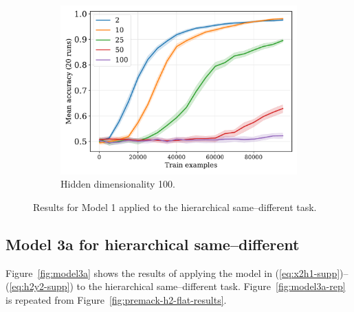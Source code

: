 \documentclass{article}
\newcommand{\Figref}[1]{Figure~\ref{#1}}
\newcommand{\figref}[1]{Figure~\ref{#1}}
\newcommand{\eg}[1]{(\ref{#1})}
\newcommand{\dasheg}[2]{\eg{#1}--\eg{#2}}
\begin{document}
\begin{figure}[H]
  \begin{subfigure}{0.45\linewidth}
    \includegraphics[width=1\textwidth]{./flatpremack-h1-train_size-embed_dim-hidden_dim=100.pdf}
    \caption{Hidden dimensionality 100.}
  \end{subfigure}
  \caption{Results for Model 1 applied to the hierarchical same--different task.}
  \label{fig:model1:premack}
\end{figure}


\newpage


\subsection{Model 3a for hierarchical same--different}

\Figref{fig:model3a} shows the results of applying the model in \dasheg{eq:x2h1-supp}{eq:h2y2-supp} to the hierarchical same--different task. \Figref{fig:model3a-rep} is repeated from \figref{fig:premack-h2-flat-results}.
\end{document}
